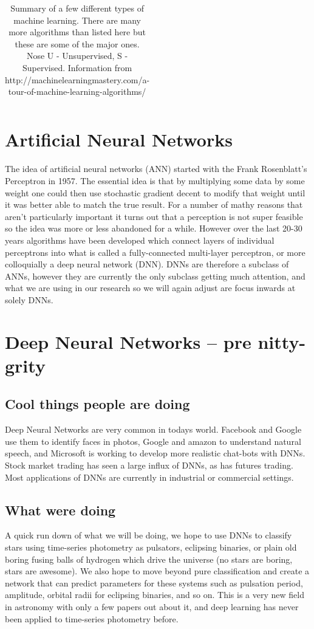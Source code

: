 \documentclass[a4paper]{article}
\begin{document}
\begin{table}
\begin{tabular}{|p{3cm}|p{1cm}|p{5cm}|p{4cm}|p{4cm}|}
    \hline
    \end{tabular}
    \caption{Summary of a few different types of machine learning. There are many more algorithms than listed here but these are some of the major ones. Nose U - Unsupervised, S - Supervised. Information from http://machinelearningmastery.com/a-tour-of-machine-learning-algorithms/}
    \label{MLSum}
\end{table}

\section{Artificial Neural Networks}
The idea of artificial neural networks (ANN) started with the Frank Rosenblatt's Perceptron in 1957\cite{Ros57}. The essential idea is that by multiplying some data by some weight one could then use stochastic gradient decent to modify that weight until it was better able to match the true result. For a number of mathy reasons that aren't particularly important it turns out that a perception is not super feasible so the idea was more or less abandoned for a while. However over the last 20-30 years algorithms have been developed which connect layers of individual perceptrons into what is called a fully-connected multi-layer perceptron, or more colloquially a deep neural network (DNN). DNNs are therefore a subclass of ANNs, however they are currently the only subclass getting much attention, and what we are using in our research so we will again adjust are focus inwards at solely DNNs.
\section{Deep Neural Networks -- pre nitty-grity}
\subsection{Cool things people are doing}
Deep Neural Networks are very common in todays world. Facebook and Google use them to identify faces in photos, Google and amazon to understand natural speech, and Microsoft is working to develop more realistic chat-bots with DNNs. Stock market trading has seen a large influx of DNNs, as has futures trading. Most applications of DNNs are currently in industrial or commercial settings. 
\subsection{What were doing}
A quick run down of what we will be doing, we hope to use DNNs to classify stars using time-series photometry as pulsators, eclipsing binaries, or plain old boring fusing balls of hydrogen which drive the universe (no stars are boring, stars are awesome). We also hope to move beyond pure classification and create a network that can predict parameters for these systems such as pulsation period, amplitude, orbital radii for eclipsing binaries, and so on. This is a very new field in astronomy with only a few papers out about it, and deep learning has never been applied to time-series photometry before.
\end{document}
